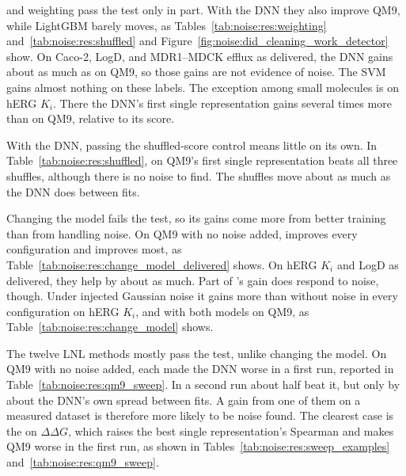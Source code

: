  and weighting pass the test only in part. With the DNN they also improve QM9, while LightGBM barely moves, as Tables~\ref{tab:noise:res:weighting} and~\ref{tab:noise:res:shuffled} and Figure~\ref{fig:noise:did_cleaning_work_detector} show. On Caco-2, LogD, and MDR1--MDCK efflux as delivered, the DNN gains about as much as on QM9, so those gains are not evidence of noise. The SVM gains almost nothing on these labels. The exception among small molecules is  on hERG $K_i$. There the DNN's first single representation gains several times more than on QM9, relative to its score.

With the DNN, passing the shuffled-score control means little on its own. In Table~\ref{tab:noise:res:shuffled},  on QM9's first single representation beats all three shuffles, although there is no noise to find. The shuffles move about as much as the DNN does between fits.

Changing the model fails the test, so its gains come more from better training than from handling noise. On QM9 with no noise added,  improves every configuration and  improves most, as Table~\ref{tab:noise:res:change_model_delivered} shows. On hERG $K_i$ and LogD as delivered, they help by about as much. Part of 's gain does respond to noise, though. Under injected Gaussian noise it gains more than without noise in every configuration on hERG $K_i$, and with both models on QM9, as Table~\ref{tab:noise:res:change_model} shows.

The twelve LNL methods mostly pass the test, unlike changing the model. On QM9 with no noise added, each made the DNN worse in a first run, reported in Table~\ref{tab:noise:res:qm9_sweep}. In a second run about half beat it, but only by about the DNN's own spread between fits. A gain from one of them on a measured dataset is therefore more likely to be noise found. The clearest case is the  on $\Delta\Delta G$, which raises the best single representation's Spearman and makes QM9 worse in the first run, as shown in Tables~\ref{tab:noise:res:sweep_examples} and~\ref{tab:noise:res:qm9_sweep}.

